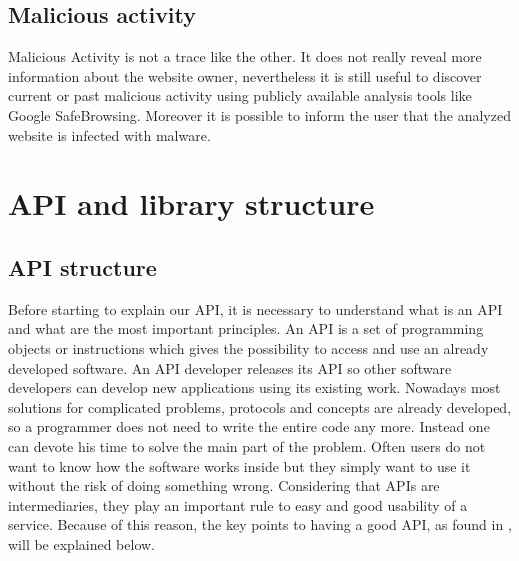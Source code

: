 \documentclass[
	a4paper,					10pt,							twoside,					openright,				notitlepage,			parskip=half,			]{scrreprt}
\begin{document}
\section{Malicious activity}
\label{sec:seltraces_MaliciousActivity}

Malicious Activity is not a trace like the other. It does not really reveal more information
about the website owner, nevertheless it is still useful to discover current or past
malicious activity using publicly available analysis tools like Google SafeBrowsing. 
Moreover it is possible to inform the user that the analyzed website is infected with malware.
\clearpage{}
\clearpage{}\chapter{\gls{API} and library structure}
\label{chap:api}

\section{\gls{API} structure}
\label{sec:api_apistruct}

Before starting to explain our \gls{API}, it is necessary to understand what is an \gls{API} 
and what are the most important principles.
An \gls{API} is a set of programming objects or instructions which gives the possibility to 
access and use an already developed software. 
An \gls{API} developer releases its \gls{API} so other software developers can develop new applications using its existing work.
Nowadays most solutions for complicated problems, protocols and concepts are already developed, 
so a programmer does not need to write the entire code any more. Instead one can devote 
his time to solve the main part of the problem. Often users do not want to know how the 
software works inside but they simply want to use it without the risk of doing something wrong. 
Considering that \gls{API}s are intermediaries, they play an important rule to easy and good usability of a service.
Because of this reason, the key points to having a good \gls{API}, as found in \cite{blanchette:manualAPIdesign}, will be explained below.
\end{document}
